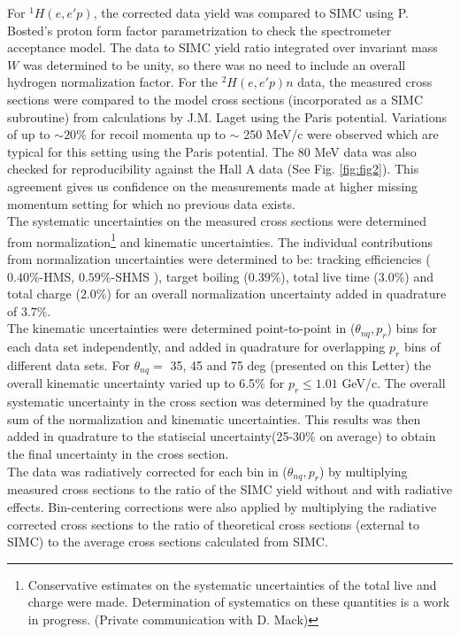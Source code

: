 For $^{1}H(e,e'p)$, the corrected data yield was compared to SIMC using P. Bosted's proton form factor parametrization\cite{PhysRevC.51.409} to check the spectrometer acceptance
model. The data to SIMC yield ratio integrated over invariant mass $W$ was determined to be unity, so there was no need to include an overall hydrogen normalization factor. For the $^{2}H(e,e'p)n$ data,
the measured cross sections were compared to the model cross sections (incorporated as a SIMC subroutine) from calculations by J.M. Laget using the Paris potential\cite{PhysRevC.21.861}. Variations
of up to $\sim 20 \%$ for recoil momenta up to $\sim$ 250 MeV/c were observed which are typical for this setting using the Paris potential. The 80 MeV data was also checked for reproducibility against the Hall A data (See Fig. \ref{fig:fig2}).
This agreement gives us confidence on the measurements made at higher missing momentum setting for which no previous data exists. \\
\indent The systematic uncertainties on the measured cross sections were determined from normalization\footnote{Conservative estimates on the systematic uncertainties of the total live and charge were made. Determination of systematics on these quantities is a work in progress. (Private communication with D. Mack)} and kinematic uncertainties. The individual contributions from normalization uncertainties
were determined to be: tracking efficiencies ($0.40 \%$-HMS, $0.59 \%$-SHMS ), target boiling ($0.39 \%$), total live time ($3.0 \%$) and total charge ($2.0\%$)
for an overall normalization uncertainty added in quadrature of $3.7 \%$. \\
\indent The kinematic uncertainties were determined point-to-point in ($\theta_{nq}, p_{r}$) bins for each data set independently, and added in quadrature for overlapping $p_{r}$ bins
of different data sets. For $\theta_{nq}=$ 35, 45 and 75 deg (presented on this Letter) the overall kinematic uncertainty varied up to 6.5$\%$ for $p_{r}\leq1.01$ GeV/c.
The overall systematic uncertainty in the cross section was determined by the quadrature sum of the normalization and kinematic uncertainties. This results was then added in quadrature
to the statiscial uncertainty(25-30$\%$ on average) to obtain the final uncertainty in the cross section. \\
\indent The data was radiatively corrected for each bin in ($\theta_{nq}, p_{r}$) by multiplying measured cross sections to the ratio of the SIMC yield without and with radiative effects. Bin-centering
corrections were also applied by multiplying the radiative corrected cross sections to the ratio of theoretical cross sections (external to SIMC) to the average cross sections calculated from SIMC.
